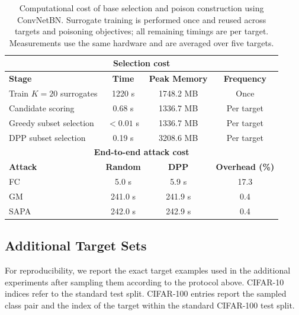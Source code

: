 \begin{table}[t]
\centering
\caption{
Computational cost of base selection and poison construction using
ConvNetBN. Surrogate training is performed once and reused across
targets and poisoning objectives; all remaining timings are per target.
Measurements use the same hardware and are averaged over five targets.
}
\label{tab:computational-cost}
\small
\setlength{\tabcolsep}{6pt}
\renewcommand{\arraystretch}{1.08}
\begin{tabular}{lccc}
\toprule
\multicolumn{4}{c}{\textbf{Selection cost}} \\
\midrule
\textbf{Stage} &
\textbf{Time} &
\textbf{Peak Memory} &
\textbf{Frequency} \\
\midrule
Train $K=20$ surrogates & 1220 s & 1748.2 MB & Once \\
Candidate scoring       & 0.68 s & 1336.7 MB & Per target \\
Greedy subset selection & $<0.01$ s & 1336.7 MB & Per target \\
DPP subset selection    & 0.19 s & 3208.6 MB & Per target \\
\midrule
\multicolumn{4}{c}{\textbf{End-to-end attack cost}} \\
\midrule
\textbf{Attack} &
\textbf{Random} &
\textbf{DPP} &
\textbf{Overhead (\%)} \\
\midrule
FC   & 5.0 s & 5.9 s & 17.3 \\
GM   & 241.0 s & 241.9 s & 0.4 \\
SAPA & 242.0 s & 242.9 s & 0.4 \\
\bottomrule
\end{tabular}
\end{table}


\subsection{Additional Target Sets}
\label{app:additional-targets}

For reproducibility, we report the exact target examples used in the
additional experiments after sampling them according to the protocol
above. CIFAR-10 indices refer to the standard test split. CIFAR-100
entries report the sampled class pair and the index of the target within
the standard CIFAR-100 test split.

